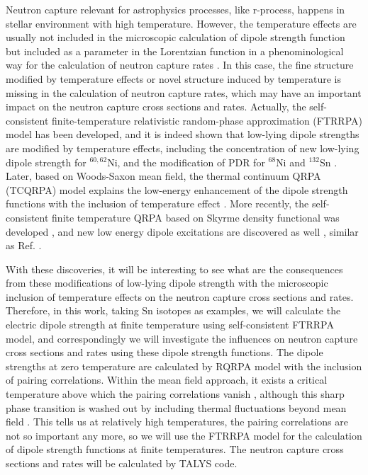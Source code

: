 \documentclass[prc,twocolumn,twoside,showpacs,superscriptaddress,floatfix]{revtex4-1}
\begin{document}
Neutron capture relevant for astrophysics processes, like r-process, happens in
stellar environment with high temperature. However, the temperature effects are
usually not included in the microscopic calculation of dipole strength function
but included as a parameter in the Lorentzian function in a phenominological
way for the calculation of neutron capture rates \cite{GorielyNPA2002,
GorielyPLB1998, Goriely2019}. In this case, the fine structure modified by
temperature effects or novel structure induced by temperature is missing in the
calculation of neutron capture rates, which may have an important impact on the
neutron capture cross sections and rates. Actually, the self-consistent
finite-temperature relativistic random-phase approximation (FTRRPA) model has
been developed, and it is indeed shown that low-lying dipole strengths are
modified by temperature effects, including the concentration of new low-lying
dipole strength for $^{60,62}$Ni, and the modification of PDR for $^{68}$Ni and
$^{132}$Sn \cite{Niu_2009}. Later, based on Woods-Saxon mean field, the thermal
continuum QRPA (TCQRPA) model explains the low-energy enhancement of the dipole
strength functions with the inclusion of temperature effect
\cite{Litvinova2013}. More recently, the self-consistent finite temperature
QRPA based on Skyrme density functional was developed \cite{Yuksel2017}, and
new low energy dipole excitations are discovered as well \cite{Yuksel2017,
Yuksel2019}, similar as Ref. \cite{Niu_2009, Litvinova2013}.

With these discoveries, it will be interesting to see what are the consequences
from these modifications of low-lying dipole strength with the microscopic
inclusion of temperature effects on the neutron capture cross sections and
rates. Therefore, in this work, taking Sn isotopes as examples, we will
calculate the electric dipole strength at finite temperature using
self-consistent FTRRPA model, and correspondingly we will investigate the
influences on neutron capture cross sections and rates using these dipole
strength functions. The dipole strengths at zero temperature are calculated by
RQRPA model with the inclusion of pairing correlations. Within the mean field
approach, it exists a critical temperature above which the pairing correlations
vanish \cite{Niu2013, Yuksel}, although this sharp phase transition is washed
out by including thermal fluctuations beyond mean field \cite{Gambarcuta}. This
tells us at relatively high temperatures, the pairing correlations are not so
important any more, so we will use the FTRRPA model for the calculation of
dipole strength functions at finite temperatures. The neutron capture cross
sections and rates will be calculated by TALYS code.
\end{document}
